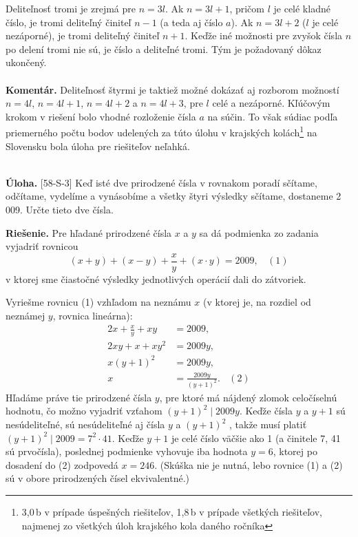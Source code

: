\documentclass[11pt,a4paper,oneside,final]{book}
\newcommand{\kom}{\textbf{Komentár.} }
\newcommand{\ul}{\textbf{Úloha.} }
\newcommand{\rie}{\textbf{Riešenie.} }
\begin{document}
Deliteľnosť tromi je zrejmá pre $n = 3l$. Ak $n = 3l + 1$, pričom $l$ je celé kladné číslo, je tromi deliteľný činiteľ $n - 1$ (a teda aj číslo $a$). Ak $n = 3l + 2$ ($l$ je celé nezáporné), je tromi deliteľný činiteľ $n + 1$. Keďže iné možnosti pre zvyšok čísla $n$ po delení tromi nie sú, je číslo a deliteľné tromi. Tým je požadovaný dôkaz ukončený.\\
\\
\kom  Deliteľnosť štyrmi je taktiež možné dokázať aj rozborom možností $n=4l$, $n=4l+1$, $n=4l+2$ a $n=4l+3$, pre $l$ celé a nezáporné. Kľúčovým krokom v riešení bolo vhodné rozloženie čísla $a$ na súčin. To však súdiac podľa priemerného počtu bodov udelených za túto úlohu v krajských kolách\footnote{3,0\,b v prípade úspešných riešiteľov, 1,8\,b v prípade všetkých riešiteľov, najmenej zo všetkých úloh krajského kola daného ročníka} na Slovensku bola úloha pre riešiteľov neľahká.\\
\\
\begin{tcolorbox}[breakable,notitle,boxrule=0pt,colback=light-gray,colframe=light-gray]\ul [58-S-3]
Keď isté dve prirodzené čísla v rovnakom poradí sčítame, odčítame, vydelíme a vynásobíme a všetky štyri výsledky sčítame, dostaneme 2 009. Určte tieto dve čísla.

\end{tcolorbox}

\rie Pre hľadané prirodzené čísla $x$ a $y$ sa dá podmienka zo zadania vyjadriť rovnicou
$$(x + y) + (x - y) +\frac{x}{y}+ (x \cdot y) = 2 009, \ \ \ \ (1)$$
v ktorej sme čiastočné výsledky jednotlivých operácií dali do zátvoriek.

Vyriešme rovnicu (1) vzhľadom na neznámu $x$ (v ktorej je, na rozdiel od neznámej $y$, rovnica lineárna):
\begin{align*}
2x +\frac{x}{y}+ xy &= 2 009,\\
2xy + x + xy^2 &= 2 009y,\\
x(y + 1)^2 &= 2 009y,\\
x &= \frac{2009y}{(y + 1)^2}. \ \ \ \ (2)
\end{align*}
Hľadáme práve tie prirodzené čísla $y$, pre ktoré má nájdený zlomok celočíselnú hodnotu, čo možno vyjadriť vzťahom $(y + 1)^2 \mid 2009y$. Keďže čísla $y$ a $y + 1$ sú nesúdeliteľné, sú nesúdeliteľné aj čísla $y$ a $(y +1)^2$ , takže musí platiť $(y +1)^2 \mid 2009 = 7^2 \cdot41$. Keďže $y +1$ je celé číslo väčšie ako 1 (a činitele 7, 41 sú prvočísla), poslednej podmienke vyhovuje iba hodnota $y = 6$, ktorej po dosadení do (2) zodpovedá $x = 246$. (Skúška nie je nutná, lebo rovnice (1) a (2) sú v obore prirodzených čísel ekvivalentné.)
\end{document}
